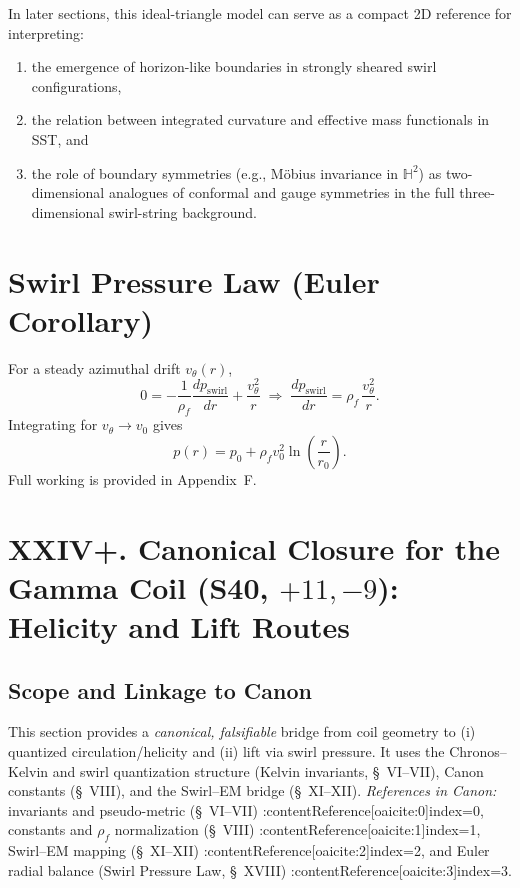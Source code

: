 \documentclass[10pt,reprint,aps,onecolumn,nofootinbib]{revtex4-2}
\newcommand{\rhof}{\rho_{\!f}}                           %
\begin{document}
        In later sections, this ideal-triangle model can serve as a compact 2D reference for interpreting:
        \begin{enumerate}
            \item the emergence of horizon-like boundaries in strongly sheared swirl configurations,
            \item the relation between integrated curvature and effective mass functionals in SST, and
            \item the role of boundary symmetries (e.g., M\"obius invariance in $\mathbb{H}^2$) as two-dimensional analogues of conformal and gauge symmetries in the full three-dimensional swirl-string background.
        \end{enumerate}

    \section{Swirl Pressure Law (Euler Corollary)}\label{canon58:pressure}
    For a steady azimuthal drift $v_\theta(r)$,
    \[
        0=-\frac{1}{\rhof}\frac{dp_{\text{swirl}}}{dr}+\frac{v_\theta^2}{r}
        \;\Rightarrow\;
        \frac{dp_{\text{swirl}}}{dr}=\rhof\,\frac{v_\theta^2}{r}.
    \]
    Integrating for $v_\theta\to v_0$ gives
    \[
        p(r)=p_0+\rhof v_0^2\ln\!\left(\frac{r}{r_0}\right).
    \]
    Full working is provided in Appendix~F.



    \section{XXIV+. Canonical Closure for the Gamma Coil (S40, $+11,-9$): Helicity and Lift Routes}
    \label{sec:GammaCoilClosure}

    \subsection*{Scope and Linkage to Canon}
        This section provides a \emph{canonical, falsifiable} bridge from coil geometry to (i) quantized circulation/helicity and (ii) lift via swirl pressure. It uses the Chronos--Kelvin and swirl quantization structure (Kelvin invariants, \S~VI--VII), Canon constants (\S~VIII), and the Swirl--EM bridge (\S~XI--XII). %
        \emph{References in Canon:} invariants and pseudo-metric (\S~VI--VII) :contentReference[oaicite:0]{index=0}, constants and $\rho_{\!f}$ normalization (\S~VIII) :contentReference[oaicite:1]{index=1}, Swirl--EM mapping (\S~XI--XII) :contentReference[oaicite:2]{index=2}, and Euler radial balance (Swirl Pressure Law, \S~XVIII) :contentReference[oaicite:3]{index=3}.
\end{document}
